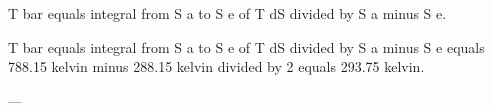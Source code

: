 T bar equals integral from S a to S e of T dS divided by S a minus S e.  

T bar equals integral from S a to S e of T dS divided by S a minus S e equals 788.15 kelvin minus 288.15 kelvin divided by 2 equals 293.75 kelvin.  

---